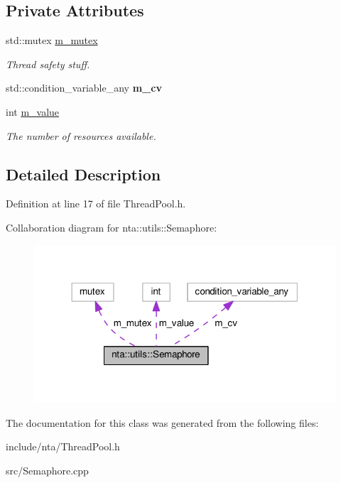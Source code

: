 \subsection*{Private Attributes}
\begin{DoxyCompactItemize}
\item 
\mbox{\label{classnta_1_1utils_1_1Semaphore_a5d349e7ced70eb07eea6b9cfa50a6637}} 
std\+::mutex \hyperlink{classnta_1_1utils_1_1Semaphore_a5d349e7ced70eb07eea6b9cfa50a6637}{m\+\_\+mutex}
\begin{DoxyCompactList}\small\item\em Thread safety stuff. \end{DoxyCompactList}\item 
\mbox{\label{classnta_1_1utils_1_1Semaphore_a30bfcf40c58c71847933806aeab36b30}} 
std\+::condition\+\_\+variable\+\_\+any {\bfseries m\+\_\+cv}
\item 
\mbox{\label{classnta_1_1utils_1_1Semaphore_a7b21b47d4cfecfeeb97758916e23c9bc}} 
int \hyperlink{classnta_1_1utils_1_1Semaphore_a7b21b47d4cfecfeeb97758916e23c9bc}{m\+\_\+value}
\begin{DoxyCompactList}\small\item\em The number of resources available. \end{DoxyCompactList}\end{DoxyCompactItemize}


\subsection{Detailed Description}


Definition at line 17 of file Thread\+Pool.\+h.



Collaboration diagram for nta\+:\+:utils\+:\+:Semaphore\+:\nopagebreak
\begin{figure}[H]
\begin{center}
\leavevmode
\includegraphics[width=318pt]{da/d79/classnta_1_1utils_1_1Semaphore__coll__graph}
\end{center}
\end{figure}


The documentation for this class was generated from the following files\+:\begin{DoxyCompactItemize}
\item 
include/nta/Thread\+Pool.\+h\item 
src/Semaphore.\+cpp\end{DoxyCompactItemize}
